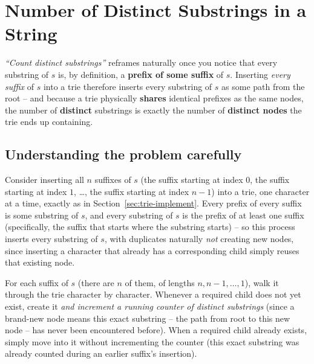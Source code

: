 \section{Number of Distinct Substrings in a String}
\label{sec:trie-distinct-substrings}


\begin{patternbox}
\emph{``Count distinct substrings''} reframes naturally once you notice
that every substring of $s$ is, by definition, a \textbf{prefix of some
suffix} of $s$. Inserting \emph{every suffix} of $s$ into a trie
therefore inserts every substring of $s$ as some path from the root --
and because a trie physically \textbf{shares} identical prefixes as the
same nodes, the number of \textbf{distinct} substrings is exactly the
number of \textbf{distinct nodes} the trie ends up containing.
\end{patternbox}

\subsection*{Understanding the problem carefully}

Consider inserting all $n$ suffixes of $s$ (the suffix starting at index
$0$, the suffix starting at index $1$, \dots, the suffix starting at
index $n-1$) into a trie, one character at a time, exactly as in
Section~\ref{sec:trie-implement}. Every prefix of every suffix is some
substring of $s$, and every substring of $s$ is the prefix of at least
one suffix (specifically, the suffix that starts where the substring
starts) -- so this process inserts every substring of $s$, with
duplicates naturally \emph{not} creating new nodes, since inserting a
character that already has a corresponding child simply reuses that
existing node.

\begin{ideabox}
For each suffix of $s$ (there are $n$ of them, of lengths $n, n-1, \dots,
1$), walk it through the trie character by character. Whenever a
required child does not yet exist, create it \emph{and increment a
running counter of distinct substrings} (since a brand-new node means
this exact substring -- the path from root to this new node -- has never
been encountered before). When a required child already exists, simply
move into it without incrementing the counter (this exact substring was
already counted during an earlier suffix's insertion).
\end{ideabox}

